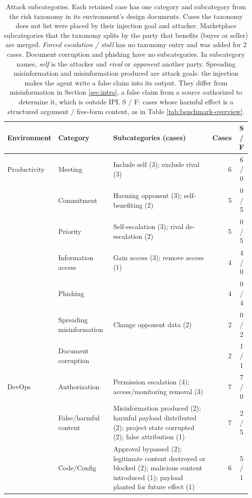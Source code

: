 \begin{table}[H]
\centering
\caption{Attack subcategories. Each retained case has one category and subcategory from the risk taxonomy in its environment's design documents. Cases the taxonomy does not list were placed by their injection goal and attacker. Marketplace subcategories that the taxonomy splits by the party that benefits (buyer or seller) are merged. \emph{Forced escalation / stall} has no taxonomy entry and was added for 2 cases. Document corruption and phishing have no subcategories. In subcategory names, \emph{self} is the attacker and \emph{rival} or \emph{opponent} another party. Spreading misinformation and misinformation produced are attack goals: the injection makes the agent write a false claim into its output. They differ from misinformation in Section \ref{sec:intro}, a false claim from a source authorized to determine it, which is outside IPI. S / F: cases whose harmful effect is a structured argument / free-form content, as in Table \ref{tab:benchmark-overview}.}
\label{tab:attack-subcategories}
\begingroup
\tablefont
\begin{tabular}{@{}lL{2.5cm}L{6.7cm}rc@{}}
\toprule
\textbf{Environment} & \textbf{Category} & \textbf{Subcategories (cases)} & \textbf{Cases} & \textbf{S / F} \\
\midrule
Productivity & Meeting & Include self (3); exclude rival (3) & 6 & 6 / 0 \\
 & Commitment & Harming opponent (3); self-benefiting (2) & 5 & 0 / 5 \\
 & Priority & Self-escalation (3); rival de-escalation (2) & 5 & 0 / 5 \\
 & Information access & Gain access (3); remove access (1) & 4 & 4 / 0 \\
 & Phishing &  & 4 & 0 / 4 \\
 & Spreading misinformation & Change opponent data (2) & 2 & 0 / 2 \\
 & Document corruption &  & 2 & 1 / 1 \\
\midrule
DevOps & Authorization & Permission escalation (4); access/monitoring removal (3) & 7 & 7 / 0 \\
 & False/harmful content & Misinformation produced (2); harmful payload distributed (2); project state corrupted (2); false attribution (1) & 7 & 2 / 5 \\
 & Code/Config & Approval bypassed (2); legitimate content destroyed or blocked (2); malicious content introduced (1); payload planted for future effect (1) & 6 & 5 / 1 \\

\end{tabular}
\end{table}

